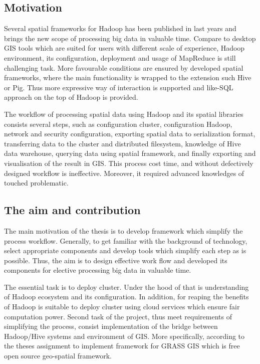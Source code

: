 \documentclass[a4paper,12pt,oneside]{report}
\begin{document}
\subsection*{Motivation}
Several spatial frameworks for Hadoop has been published in last years and brings the new 	
scope of  processing big data in valuable time. Compare to  desktop GIS tools which are suited for users with different scale of experience, Hadoop environment, its configuration, deployment and usage of MapReduce is still challenging task. More favourable conditions are ensured by developed spatial frameworks, where the  main functionality is wrapped to the extension such Hive or Pig.  Thus more expressive way of interaction is supported and like-SQL approach on the top of Hadoop is provided. 

The workflow of processing spatial data using  Hadoop and its spatial libraries consists several steps, such as configuration cluster, configuration Hadoop, network and security configuration, exporting spatial data to serialization format, transferring data to the cluster and distributed filesystem, knowledge of Hive data warehouse, querying data using spatial framework, and  finally exporting and visualisation of the result in GIS. This process cost time, and without defectively designed workflow is ineffective. Moreover, it required advanced knowledges of touched problematic. 

\subsection*{The aim and contribution}
The main motivation of the thesis is to develop framework which simplify the process workflow. Generally, to get familiar with the background of technology, select appropriate components and develop tools which simplify each step as is possible. Thus, the aim is to design effective work flow and developed its components for elective processing big data in valuable time.

The essential task is to deploy cluster.  Under the hood of that is understanding of Hadoop ecosystem and its configuration. In addition, for reaping the benefits of Hadoop is suitable to deploy cluster using cloud services which ensure fair computation power.  Second task of the project, thus  meet requirements of simplifying the process, consist implementation of the bridge between Hadoop/Hive systems and environment of GIS. More specifically, according to the theses assignment to implement framework for GRASS GIS which is free open source geo-spatial framework.
\end{document}
